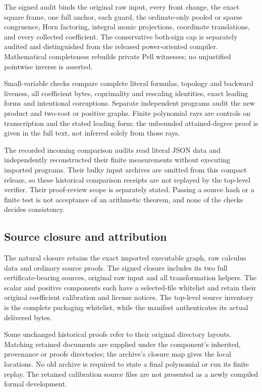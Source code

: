 The signed audit binds the original raw input, every front change, the exact square frame, one full anchor, each guard, the ordinate-only pooled or sparse congruence, Horn factoring, integral monic projections, coordinate translations, and every collected coefficient. The conservative both-sign cap is separately audited and distinguished from the released power-oriented compiler. Mathematical completeness rebuilds private Pell witnesses; no unjustified pointwise inverse is asserted.

Small-variable checks compare complete literal formulas, topology and backward liveness, all coefficient bytes, coprimality and rescaling identities, exact leading forms and intentional corruptions. Separate independent programs audit the new product and two-root or positive graphs. Finite polynomial rays are controls on transcription and the stated leading form; the unbounded attained-degree proof is given in the full text, not inferred solely from those rays.

The recorded incoming comparison audits read literal JSON data and independently reconstructed their finite measurements without executing imported programs. Their bulky input archives are omitted from this compact release, so these historical comparison receipts are not replayed by the top-level verifier. Their proof-review scope is separately stated. Passing a source hash or a finite test is not acceptance of an arithmetic theorem, and none of the checks decides consistency.

\subsection{Source closure and attribution}
The natural closure retains the exact imported executable graph, raw calculus data and ordinary source proofs. The signed closure includes its two full certificate-bearing sources, original raw input and all transformation helpers. The scalar and positive components each have a selected-file whitelist and retain their original coefficient calibration and license notices. The top-level source inventory is the complete packaging whitelist, while the manifest authenticates its actual delivered bytes.

Some unchanged historical proofs refer to their original directory layouts. Matching retained documents are supplied under the component's inherited, provenance or proofs directories; the archive's closure map gives the local locations. No old archive is required to state a final polynomial or run its finite replay. The retained calibration source files are not presented as a newly compiled formal development.
